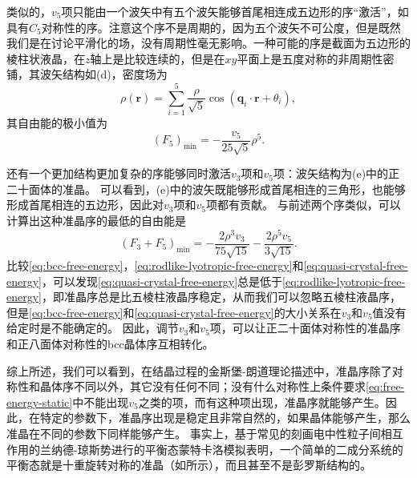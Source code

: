 \documentclass[hyperref, UTF8, a4paper]{ctexart}
\begin{document}
类似的，$v_5$项只能由一个波矢中有五个波矢能够首尾相连成五边形的序“激活”，如具有$C_5$对称性的序。注意这个序不是周期的，因为五个波矢不可公度，但是既然我们是在讨论平滑化的场，没有周期性毫无影响。一种可能的序是截面为五边形的棱柱状液晶，在$z$轴上是比较连续的，但是在$xy$平面上是五度对称的非周期性密铺，其波矢结构如(d)，密度场为
\begin{equation}
    \rho(\boldsymbol{r})=\sum_{i=1}^{5} \frac{\rho}{\sqrt{5}} \cos \left(\boldsymbol{q}_{i} \cdot \boldsymbol{r}+\theta_{i}\right),
\end{equation}
其自由能的极小值为
\begin{equation}
    (F_{5})_\text{min} =-\frac{v_{5}}{25 \sqrt{5}} \rho^{5}.
    \label{eq:rodlike-lyotropic-free-energy}
\end{equation}

还有一个更加结构更加复杂的序能够同时激活$v_3$项和$v_5$项：波矢结构为(e)中的正二十面体的准晶。
可以看到，(e)中的波矢既能够形成首尾相连的三角形，也能够形成首尾相连的五边形，因此对$v_3$项和$v_5$项都有贡献。
与前述两个序类似，可以计算出这种准晶序的最低的自由能是
\begin{equation}
    \left(F_{3}+F_{5}\right)_{\min }=-\frac{2 \rho^{3} v_{3}}{75 \sqrt{15}}-\frac{2 \rho^{5} v_{5}}{3 \sqrt{15}}.
    \label{eq:quasi-crystal-free-energy}
\end{equation}
比较\eqref{eq:bcc-free-energy}，\eqref{eq:rodlike-lyotropic-free-energy}和\eqref{eq:quasi-crystal-free-energy}，可以发现\eqref{eq:quasi-crystal-free-energy}总是低于\eqref{eq:rodlike-lyotropic-free-energy}，即准晶序总是比五棱柱液晶序稳定，从而我们可以忽略五棱柱液晶序，但是\eqref{eq:bcc-free-energy}和\eqref{eq:quasi-crystal-free-energy}的大小关系在$v_3$和$v_5$值没有给定时是不能确定的。
因此，调节$v_3$和$v_5$项，可以让正二十面体对称性的准晶序和正八面体对称性的bcc晶体序互相转化。

综上所述，我们可以看到，在结晶过程的金斯堡-朗道理论描述中，准晶序除了对称性和晶体序不同以外，其它没有任何不同；没有什么对称性上条件要求\eqref{eq:free-energy-static}中不能出现$v_5$之类的项，而有这种项出现，准晶序就能够产生。因此，在特定的参数下，准晶序出现是稳定且非常自然的，如果晶体能够产生，那么准晶在不同的参数下同样能够产生。
事实上，基于常见的刻画电中性粒子间相互作用的兰纳德-琼斯势进行的平衡态蒙特卡洛模拟表明，一个简单的二成分系统的平衡态就是十重旋转对称的准晶（如所示），而且甚至不是彭罗斯结构的\cite{PhysRevLett.58.706}。
\end{document}

